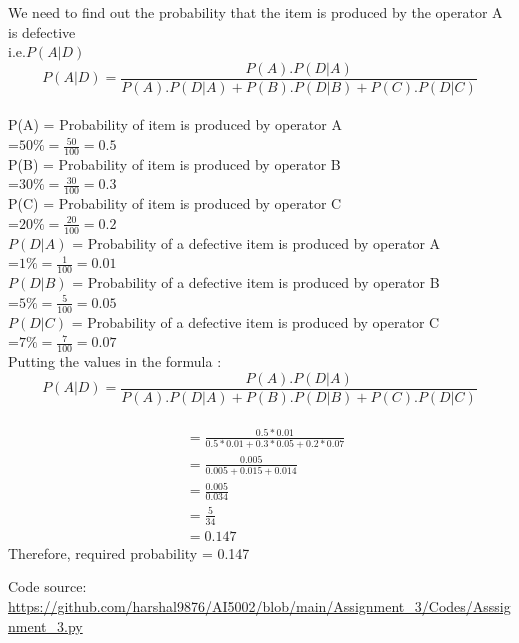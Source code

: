 \documentclass[journal,12pt,twocolumn]{IEEEtran}
\begin{document}
We need to find out the probability that the item is produced by the operator A is defective \\
 i.e.$P(A|D)$ \\
 $$P(A|D) = \frac{P(A).P(D|A)}{P(A).P(D|A) + P(B).P(D|B) + P(C).P(D|C)}$$ \\
 P(A) =  Probability of item is produced by operator A \\
 =$ 50\% = \frac{50}{100} = 0.5$ \\
  P(B) =  Probability of item is produced by operator B\\
 =$ 30\% = \frac{30}{100} = 0.3$ \\
  P(C) =  Probability of item is produced by operator C\\
 =$ 20\% = \frac{20}{100} = 0.2$ \\
  $P(D|A)$ =  Probability of a defective item is produced by operator A \\
 =$ 1\% = \frac{1}{100} = 0.01$ \\
  $P(D|B)$ =  Probability of a defective item is produced by operator B \\
 =$ 5\% = \frac{5}{100} = 0.05$ \\
  $P(D|C)$ =  Probability of a defective item is produced by operator C \\
 =$ 7\% = \frac{7}{100} = 0.07$ \\
 Putting the values in the formula :\\
  $$P(A|D) = \frac{P(A).P(D|A)}{P(A).P(D|A) + P(B).P(D|B) + P(C).P(D|C)}$$ \\
  \begin{align*}
&=\frac{0.5 * 0.01}{0.5 * 0.01 + 0.3 * 0.05 + 0.2 * 0.07}\\
&= \frac{0.005}{0.005 + 0.015 + 0.014 }\\
&=\frac{0.005}{0.034}\\
&=\frac{5}{34}\\
&=0.147
  \end{align*}
Therefore, required probability = 0.147 
\\
\begin{tcolorbox}
Code source: \url{https://github.com/harshal9876/AI5002/blob/main/Assignment_3/Codes/Asssignment_3.py}
\end{tcolorbox}
\\
\end{document}
